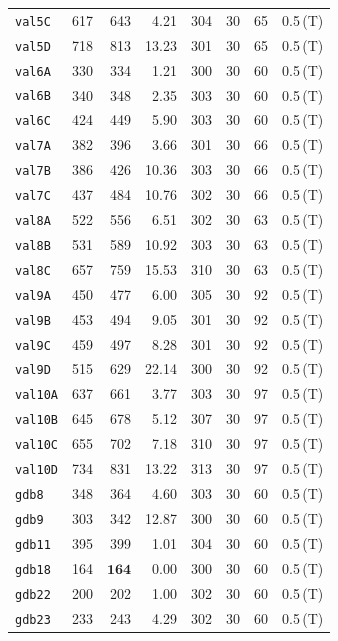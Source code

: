 \begin{longtable}{lrrrrrrl}
\texttt{val5C} & 617 & 643 & 4.21 & 304 & 30 & 65 & 0.5\,(T) \\
\texttt{val5D} & 718 & 813 & 13.23 & 301 & 30 & 65 & 0.5\,(T) \\
\texttt{val6A} & 330 & 334 & 1.21 & 300 & 30 & 60 & 0.5\,(T) \\
\texttt{val6B} & 340 & 348 & 2.35 & 303 & 30 & 60 & 0.5\,(T) \\
\texttt{val6C} & 424 & 449 & 5.90 & 303 & 30 & 60 & 0.5\,(T) \\
\texttt{val7A} & 382 & 396 & 3.66 & 301 & 30 & 66 & 0.5\,(T) \\
\texttt{val7B} & 386 & 426 & 10.36 & 303 & 30 & 66 & 0.5\,(T) \\
\texttt{val7C} & 437 & 484 & 10.76 & 302 & 30 & 66 & 0.5\,(T) \\
\texttt{val8A} & 522 & 556 & 6.51 & 302 & 30 & 63 & 0.5\,(T) \\
\texttt{val8B} & 531 & 589 & 10.92 & 303 & 30 & 63 & 0.5\,(T) \\
\texttt{val8C} & 657 & 759 & 15.53 & 310 & 30 & 63 & 0.5\,(T) \\
\texttt{val9A} & 450 & 477 & 6.00 & 305 & 30 & 92 & 0.5\,(T) \\
\texttt{val9B} & 453 & 494 & 9.05 & 301 & 30 & 92 & 0.5\,(T) \\
\texttt{val9C} & 459 & 497 & 8.28 & 301 & 30 & 92 & 0.5\,(T) \\
\texttt{val9D} & 515 & 629 & 22.14 & 300 & 30 & 92 & 0.5\,(T) \\
\texttt{val10A} & 637 & 661 & 3.77 & 303 & 30 & 97 & 0.5\,(T) \\
\texttt{val10B} & 645 & 678 & 5.12 & 307 & 30 & 97 & 0.5\,(T) \\
\texttt{val10C} & 655 & 702 & 7.18 & 310 & 30 & 97 & 0.5\,(T) \\
\texttt{val10D} & 734 & 831 & 13.22 & 313 & 30 & 97 & 0.5\,(T) \\
\texttt{gdb8} & 348 & 364 & 4.60 & 303 & 30 & 60 & 0.5\,(T) \\
\texttt{gdb9} & 303 & 342 & 12.87 & 300 & 30 & 60 & 0.5\,(T) \\
\texttt{gdb11} & 395 & 399 & 1.01 & 304 & 30 & 60 & 0.5\,(T) \\
\texttt{gdb18} & 164 & $\mathbf{164}$ & 0.00 & 300 & 30 & 60 & 0.5\,(T) \\
\texttt{gdb22} & 200 & 202 & 1.00 & 302 & 30 & 60 & 0.5\,(T) \\
\texttt{gdb23} & 233 & 243 & 4.29 & 302 & 30 & 60 & 0.5\,(T) \\

\end{longtable}
